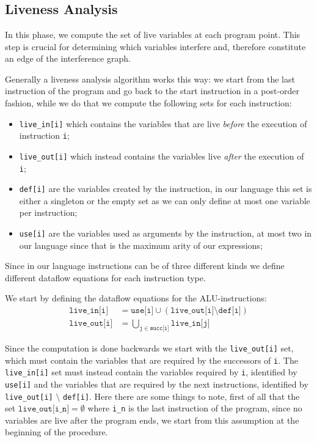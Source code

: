 
\chapter{}
\label{cha:ra}

\section{Liveness Analysis}
\label{sec:liveness}

In this phase, we compute the set of live variables at each program point. This step is crucial for determining which variables interfere and, therefore constitute an edge of the interference graph.

Generally a liveness analysis algorithm works this way:
we start from the last instruction of the program and go back to the start instruction in a post-order fashion, while we do that we compute the following sets for each instruction:
\begin{itemize}
  \item \texttt{live\_in[i]} which contains the variables that are live \textit{before} the execution of instruction \texttt i;
  \item \texttt{live\_out[i]} which instead contains the variables live \textit{after} the execution of \texttt i;
  \item \texttt{def[i]} are the variables created by the instruction, in our language this set is either a singleton or the empty set as we can only define at most one variable per instruction;
  \item \texttt{use[i]} are the variables used as arguments by the instruction, at most two in our language since that is the maximum arity of our expressions;
\end{itemize}

Since in our language instructions can be of three different kinds we define different dataflow equations for each instruction type.

We start by defining the dataflow equations for the ALU-instructions:
\begin{align*}
  \texttt{live\_in[i]} &= \texttt{use[i]} \cup (\texttt{live\_out[i]} \setminus \texttt{def[i]}) \\
  \texttt{live\_out[i]} &= \bigcup \limits_{\texttt j \in \texttt{succ[i]}} \texttt{live\_in[j]}
\end{align*}

Since the computation is done backwards we start with the \texttt{live\_out[i]} set, which must contain the variables that are required by the successors of \texttt i. The
\texttt{live\_in[i]} set must instead contain the variables required by \texttt i, identified by \texttt{use[i]} and the variables that are required by the next instructions, identified by \texttt{live\_out[i]} $\setminus$ \texttt{def[i]}.
Here there are some things to note, first of all that the set $\texttt{live\_out[i\_n]} = \emptyset$ where \texttt{i\_n} is the last instruction of the program, since no variables are live after the program ends, we start from this assumption at the beginning of the procedure.


